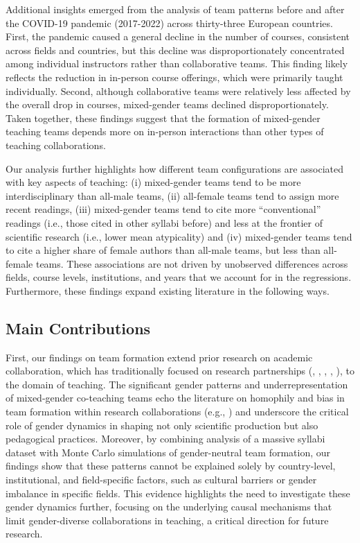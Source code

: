 \documentclass[
  11pt,
]{article}
\begin{document}
Additional insights emerged from the analysis of team patterns before and after the COVID-19 pandemic (2017-2022) across thirty-three European countries. First, the pandemic caused a general decline in the number of courses, consistent across fields and countries, but this decline was disproportionately concentrated among individual instructors rather than collaborative teams. This finding likely reflects the reduction in in-person course offerings, which were primarily taught individually. Second, although collaborative teams were relatively less affected by the overall drop in courses, mixed-gender teams declined disproportionately. Taken together, these findings suggest that the formation of mixed-gender teaching teams depends more on in-person interactions than other types of teaching collaborations.

Our analysis further highlights how different team configurations are associated with key aspects of teaching: (i) mixed-gender teams tend to be more interdisciplinary than all-male teams, (ii) all-female teams tend to assign more recent readings, (iii) mixed-gender teams tend to cite more ``conventional'' readings (i.e., those cited in other syllabi before) and less at the frontier of scientific research (i.e., lower mean atypicality) and (iv) mixed-gender teams tend to cite a higher share of female authors than all-male teams, but less than all-female teams. These associations are not driven by unobserved differences across fields, course levels, institutions, and years that we account for in the regressions. Furthermore, these findings expand existing literature in the following ways.

\subsection{Main Contributions}\label{main-contributions}

First, our findings on team formation extend prior research on academic collaboration, which has traditionally focused on research partnerships (, , , , ), to the domain of teaching. The significant gender patterns and underrepresentation of mixed-gender co-teaching teams echo the literature on homophily and bias in team formation within research collaborations (e.g., ) and underscore the critical role of gender dynamics in shaping not only scientific production but also pedagogical practices. Moreover, by combining analysis of a massive syllabi dataset with Monte Carlo simulations of gender-neutral team formation, our findings show that these patterns cannot be explained solely by country-level, institutional, and field-specific factors, such as cultural barriers or gender imbalance in specific fields. This evidence highlights the need to investigate these gender dynamics further, focusing on the underlying causal mechanisms that limit gender-diverse collaborations in teaching, a critical direction for future research.
\end{document}
